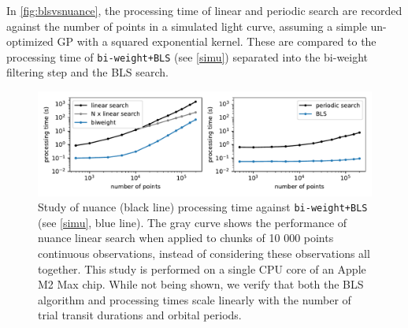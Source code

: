 \documentclass[modern]{aastex631}
\begin{document}
\noindent In \autoref{fig:blsvsnuance}, the processing time of \nuancecode{} linear and periodic search are recorded against the number of points in a simulated light curve, assuming a simple un-optimized GP with a squared exponential kernel. These are compared to the processing time of \texttt{bi-weight+BLS} (see \autoref{simu}) separated into the bi-weight filtering step and the BLS search.
\begin{figure}[H]
    \begin{centering}
        \includegraphics[width=\linewidth]{./nuance_vs_bls.pdf}
        \caption{Study of \textsf{nuance} (black line) processing time against \texttt{bi-weight+BLS} (see \autoref{simu}, blue line). The gray curve shows the performance of \textsf{nuance} linear search when applied to chunks of 10 000 points continuous observations, instead of considering these observations all together. This study is performed on a single CPU core of an Apple M2 Max chip. While not being shown, we verify that both the BLS algorithm and \nuancemethod{} processing times scale linearly with the number of trial transit durations and orbital periods. }
        \label{fig:blsvsnuance}
    \end{centering}
\end{figure}
\end{document}
